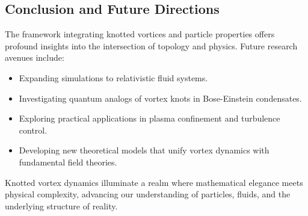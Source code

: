 \subsection*{Conclusion and Future Directions}


The framework integrating knotted vortices and particle properties offers profound insights into the intersection of topology and physics. Future research avenues include:


\begin{itemize}

\item Expanding simulations to relativistic fluid systems.

\item Investigating quantum analogs of vortex knots in Bose-Einstein condensates.

\item Exploring practical applications in plasma confinement and turbulence control.

\item Developing new theoretical models that unify vortex dynamics with fundamental field theories.

\end{itemize}

Knotted vortex dynamics illuminate a realm where mathematical elegance meets physical complexity, advancing our understanding of particles, fluids, and the underlying structure of reality.

